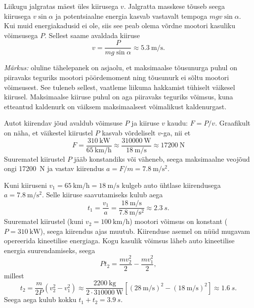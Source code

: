 \documentclass[10pt]{article}
\begin{document}
\osa Liikugu jalgratas mäest üles kiirusega $v$. Jalgratta masskese tõuseb seega kiirusega $v\sin\alpha$ ja potentsiaalne energia kasvab vastavalt tempoga $mgv\sin\alpha$. Kui muid energiakadusid ei ole, siis see peab olema võrdne mootori kasuliku võimsusega $P$. Sellest saame avaldada kiiruse
\[
v=\frac{P}{mg\sin\alpha}\approx \SI{5.3}{\meter\per\second}.
\]

\textit{Märkus:} oluline tähelepanek on asjaolu, et maksimaalse tõusunurga puhul on piiravaks teguriks mootori pöördemoment ning tõusunurk ei sõltu mootori võimsusest. See tuleneb sellest, vaatleme liikuma hakkamist tühiselt väikesel kiirusel. Maksimaalse kiiruse puhul on aga piiravaks teguriks võimsus, kuna etteantud kaldenurk on väiksem maksimaalsest võimalikust kaldenurgast.
\probend
\bigskip


\solu
\osa Autot kiirendav jõud avaldub võimsuse $P$ ja kiiruse $v$ kaudu: $F=P/v$. Graafikult on näha, et väikestel kiirustel $P$ kasvab võrdeliselt $v$-ga, nii et
\[
F=\frac{\SI{310}{\kilo\watt}}{\SI{65}{\kilo\meter\per\hour}}
\approx\frac{\SI{310000}{\watt}}{\SI{18}{\meter\per\second}}\approx\SI{17200}{\newton}
\]
Suurematel kiirustel $P$ jääb konstandiks või väheneb, seega maksimaalne veojõud ongi \SI{17200}{N} ja vastav kiirendus $a=F/m=\SI{7.8}{\meter\per\second\squared}$.

\osa Kuni kiiruseni $v_1=\SI{65}{\kilo\meter\per\hour}=\SI{18}{\meter\per\second}$ kulgeb auto ühtlase kiirendusega $a=\SI{7.8}{\meter\per\second\squared}$. Selle kiiruse saavutamiseks kulub aega
\[
t_1=\frac{v_1}{a}= \frac{\SI{18}{\meter\per\second}}{\SI{7.8}{\meter\per\second\squared}} \approx \SI{2.3}{s}.
\]
Suurematel kiirustel (kuni $v_2=\SI{100}{\kilo\meter\per\hour}$) mootori võimsus on konstant ($P=\SI{310}{\kilo\watt}$), seega kiirendus ajas muutub. Kiirenduse asemel on nüüd mugavam opereerida kineetilise energiaga. Kogu kasulik võimsus läheb auto kineetilise energia suurendamiseks, seega
\[
Pt_2=\frac{mv_2^2}{2} - \frac{mv_1^2}{2},
\]
millest
\[
t_2=\frac{m}{2P}(v_2^2-v_1^2)\approx \frac{\SI{2200}{\kilo\gram}}{2\cdot \SI{310000}{\watt}}\left[(\SI{28}{\meter\per\second})^2 - (\SI{18}{\meter\per\second})^2 \right]\approx \SI{1.6}{s}.
\]
Seega aega kulub kokku $t_1+t_2=\SI{3.9}{s}$.
\probend
\bigskip

\end{document}
